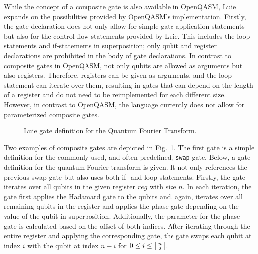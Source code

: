 While the concept of a composite gate is also available in OpenQASM, Luie expands on the possibilities provided by OpenQASM's implementation. Firstly, the gate declaration does not only allow for simple gate application statements but also for the control flow statements provided by Luie. This includes the loop statements and if-statements in superposition; only qubit and register declarations are prohibited in the body of gate declarations. In contrast to composite gates in OpenQASM, not only qubits are allowed as arguments but also registers. Therefore, registers can be given as arguments, and the loop statement can iterate over them, resulting in gates that can depend on the length of a register and do not need to be reimplemented for each different size. However, in contrast to OpenQASM, the language currently does not allow for parameterized composite gates.

\begin{figure}[htp]
    \centering     
    
    \caption{Luie gate definition for the Quantum Fourier Transform.}
    \label{fig:qft_example}
\end{figure}

Two examples of composite gates are depicted in Fig.~\ref{fig:qft_example}. The first gate is a simple definition for the commonly used, and often predefined, \texttt{swap} gate. Below, a gate definition for the quantum Fourier transform is given. It not only references the previous swap gate but also uses both if- and loop statements. Firstly, the gate iterates over all qubits in the given register $reg$ with size $n$. In each iteration, the gate first applies the Hadamard gate to the qubits and, again, iterates over all remaining qubits in the register and applies the phase gate depending on the value of the qubit in superposition. Additionally, the parameter for the phase gate is calculated based on the offset of both indices. After iterating through the entire register and applying the corresponding gate, the gate swaps each qubit at index $i$ with the qubit at index $n - i$ for $0 \leq i \leq \floor*{\frac{n}{2}}$.